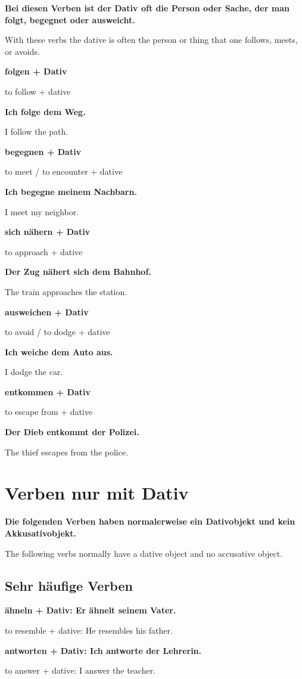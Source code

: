 \documentclass[a4paper]{article}
\newcommand{\EN}[1]{\par{\small\textcolor{TranslationGray}{#1}}\vspace{0.4em}}
\begin{document}
            \textbf{Bei diesen Verben ist der Dativ oft die Person oder Sache, der man folgt, begegnet oder ausweicht.}
            \EN{With these verbs the dative is often the person or thing that one follows, meets, or avoids.}
            
            \textbf{folgen + Dativ}
            \EN{to follow + dative}
            
            \textbf{Ich folge dem Weg.}
            \EN{I follow the path.}
            
            \textbf{begegnen + Dativ}
            \EN{to meet / to encounter + dative}
            
            \textbf{Ich begegne meinem Nachbarn.}
            \EN{I meet my neighbor.}
            
            \textbf{sich nähern + Dativ}
            \EN{to approach + dative}
            
            \textbf{Der Zug nähert sich dem Bahnhof.}
            \EN{The train approaches the station.}
            
            \textbf{ausweichen + Dativ}
            \EN{to avoid / to dodge + dative}
            
            \textbf{Ich weiche dem Auto aus.}
            \EN{I dodge the car.}
            
            \textbf{entkommen + Dativ}
            \EN{to escape from + dative}
            
            \textbf{Der Dieb entkommt der Polizei.}
            \EN{The thief escapes from the police.}
    
    
    \section{Verben nur mit Dativ}
        
        \textbf{Die folgenden Verben haben normalerweise ein Dativobjekt und kein Akkusativobjekt.}
        \EN{The following verbs normally have a dative object and no accusative object.}
        
        \subsection{Sehr häufige Verben}
            
            \textbf{ähneln + Dativ: Er ähnelt seinem Vater.}
            \EN{to resemble + dative: He resembles his father.}
            
            \textbf{antworten + Dativ: Ich antworte der Lehrerin.}
            \EN{to answer + dative: I answer the teacher.}
            
\end{document}
